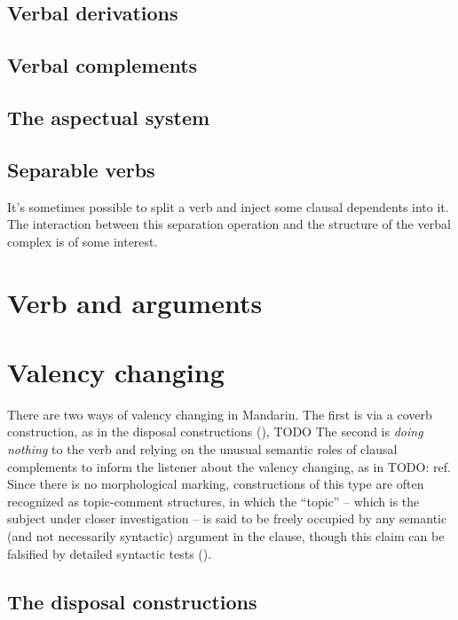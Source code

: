 \documentclass[UTF8, a4paper, oneside, scheme=plain]{ctexrep}
\begin{document}
\section{Verbal derivations}

\section{Verbal complements}\label{sec:verbal-complement}

\section{The aspectual system}\label{sec:aspectual}

\section{Separable verbs}

It's sometimes possible to split a verb and inject some clausal dependents into it.
The interaction between this separation operation and the structure of the verbal complex is of some interest.

\chapter{Verb and arguments}

\chapter{Valency changing}

There are two ways of valency changing in Mandarin.
The first is via a coverb construction, 
as in the disposal constructions (),
TODO 
The second is \emph{doing nothing} to the verb 
and relying on the unusual semantic roles of clausal complements 
to inform the listener about the valency changing,
as in TODO: ref.
Since there is no morphological marking,
constructions of this type are often recognized as topic-comment structures,
in which the ``topic'' -- which is the subject under closer investigation -- 
is said to be freely occupied by any semantic (and not necessarily syntactic) argument in the clause,
though this claim can be falsified by detailed syntactic tests ().

\section{The disposal constructions}\label{sec:disposal-construction}
\end{document}
